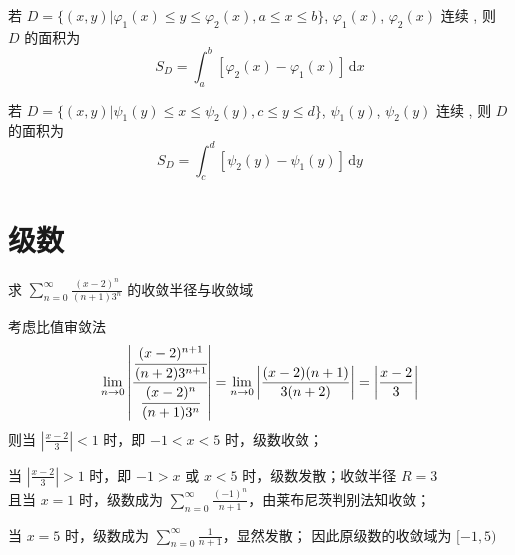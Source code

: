\documentclass[color=green,titlestyle=hang]{elegantbook}%
\begin{document}
\begin{newthem}
若 $D=\{(x,y)|\varphi_1(x)\leqslant y\leqslant\varphi_2(x),a\leqslant x\leqslant b\}$, $\varphi_1(x)$, $\varphi_2(x)$ 连续 , 则 $D$ 的面积为\begin{equation*}S_D=\int_{a}^{b}\left[\varphi_2(x)-\varphi_1(x)\right]\,\mathrm{d}x\end{equation*}	
\end{newthem}

\begin{newthem}
若 $D=\{(x,y)|\psi_1(y)\leqslant x\leqslant\psi_2(y),c\leqslant y\leqslant d\}$, $\psi_1(y)$, $\psi_2(y)$  连续 , 则 $D$ 的面积为\begin{equation*}S_D=\int_{c}^{d}\left[\psi_2(y)-\psi_1(y)\right]\,\mathrm{d}y\end{equation*}	
\end{newthem}






\chapter{级数}
\begin{example}
求 $\sum_{n=0}^{\infty}\frac{(x-2)^n}{(n+1)3^n}$ 的收敛半径与收敛域	
\end{example}\begin{Solution}考虑比值审敛法
\[\lim_{n\to0}\left|\cfrac{\cfrac{(x-2)^{n+1}}{(n+2)3^{n+1}}}{\cfrac{(x-2)^n}{(n+1)3^n}}\right|=\lim_{n\to0}\left|\frac{(x-2)(n+1)}{3(n+2)}\right|=\left|\frac{x-2}{3}\right|\]
则当 $\left|\frac{x-2}{3}\right|<1$ 时，即 $-1<x<5$ 时，级数收敛；\\
\par\setlength{\parindent}{1em}当 $\left|\frac{x-2}{3}\right|>1$ 时，即 $-1>x$ 或 $x<5$ 时，级数发散；{\color{red}收敛半径 $R=3$}\\
且当  $x=1$ 时，级数成为 $\sum_{n=0}^{\infty}\frac{(-1)^n}{n+1}$，由莱布尼茨判别法知收敛；\\
\par 当  $x=5$ 时，级数成为 $\sum_{n=0}^{\infty}\frac{1}{n+1}$，显然发散；
因此原级数的{\color{red}收敛域为 $[-1,5)$}	
\end{Solution}
\end{document}
